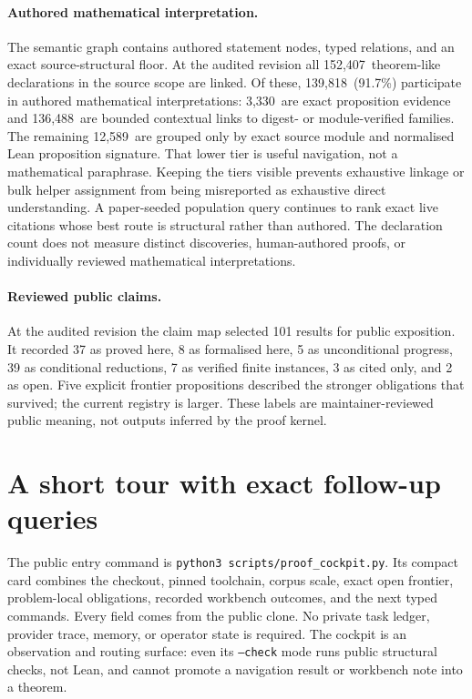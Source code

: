 \documentclass[11pt]{article}
\newcommand{\SemanticAuthoredTheoremLike}{152,407}
\newcommand{\SemanticAuthoredInterpreted}{139,818}
\newcommand{\SemanticDirectEvidence}{3,330}
\newcommand{\SemanticContextual}{136,488}
\newcommand{\SemanticStructuralOnly}{12,589}
\newcommand{\SemanticAuthoredPercent}{91.7}
\begin{document}
\paragraph{Authored mathematical interpretation.}
The semantic graph contains authored statement nodes, typed relations, and an
exact source-structural floor. At the audited revision all
\SemanticAuthoredTheoremLike\ theorem-like declarations in the source scope
are linked.
Of these, \SemanticAuthoredInterpreted\ (\SemanticAuthoredPercent\%) participate
in authored mathematical interpretations: \SemanticDirectEvidence\ are exact
proposition evidence and \SemanticContextual\ are bounded contextual links to
digest- or module-verified families. The remaining \SemanticStructuralOnly\ are grouped only by exact source
module and normalised Lean proposition signature. That lower tier is useful
navigation, not a mathematical paraphrase. Keeping the tiers visible prevents
exhaustive linkage or bulk helper assignment from being misreported as
exhaustive direct understanding. A paper-seeded population query continues to
rank exact live citations whose best route is structural rather than authored.
The declaration count does not measure distinct discoveries, human-authored
proofs, or individually reviewed mathematical interpretations.

\paragraph{Reviewed public claims.}
At the audited revision the claim map selected 101 results for public exposition.
It recorded 37 as proved here, 8 as formalised here, 5 as unconditional progress,
39 as conditional reductions, 7 as verified finite instances, 3 as cited only,
and 2 as open. Five explicit frontier propositions described the stronger
obligations that survived; the current registry is larger. These labels are maintainer-reviewed public meaning,
not outputs inferred by the proof kernel.

\section{A short tour with exact follow-up queries}\label{sec:tour}

The public entry command is
\texttt{python3 scripts/proof\_cockpit.py}.  Its compact card combines the
checkout, pinned toolchain, corpus scale, exact open frontier, problem-local
obligations, recorded workbench outcomes, and the next typed commands.  Every
field comes from the public clone.  No private task ledger, provider trace,
memory, or operator state is required.  The cockpit is an observation and
routing surface: even its \texttt{--check} mode runs public structural checks,
not Lean, and cannot promote a navigation result or workbench note into a
theorem.
\end{document}
